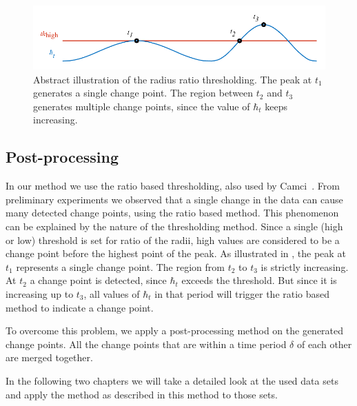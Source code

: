 \begin{figure}
  \centering
    \includegraphics[width=\textwidth,height=\textheight,keepaspectratio]{./Figures/chapter4/signal_threshold.pdf}
  \caption[Thresholding]{Abstract illustration of the radius ratio thresholding. The peak at $t_1$ generates a single change point. The region between $t_2$ and $t_3$ generates multiple change points, since the value of $\hbar_t$ keeps increasing.}
  \label{fig:tresholding}
\end{figure}

\subsection{Post-processing}
In our method we use the ratio based thresholding, also used by Camci~\cite{camci2010change}.
From preliminary experiments we observed that a single change in the data can cause many detected change points, using the ratio based method.
This phenomenon can be explained by the nature of the thresholding method.
Since a single (high or low) threshold is set for ratio of the radii, high values are considered to be a change point before the highest point of the peak.
As illustrated in , the peak at $t_1$ represents a single change point.
The region from $t_2$ to $t_3$ is strictly increasing.
At $t_2$ a change point is detected, since $\hbar_t$ exceeds the threshold.
But since it is increasing up to $t_3$, all values of $\hbar_t$ in that period will trigger the ratio based method to indicate a change point.

To overcome this problem, we apply a post-processing method on the generated change points.
All the change points that are within a time period $\delta$ of each other are merged together.

In the following two chapters we will take a detailed look at the used data sets and apply the method as described in this method to those sets.